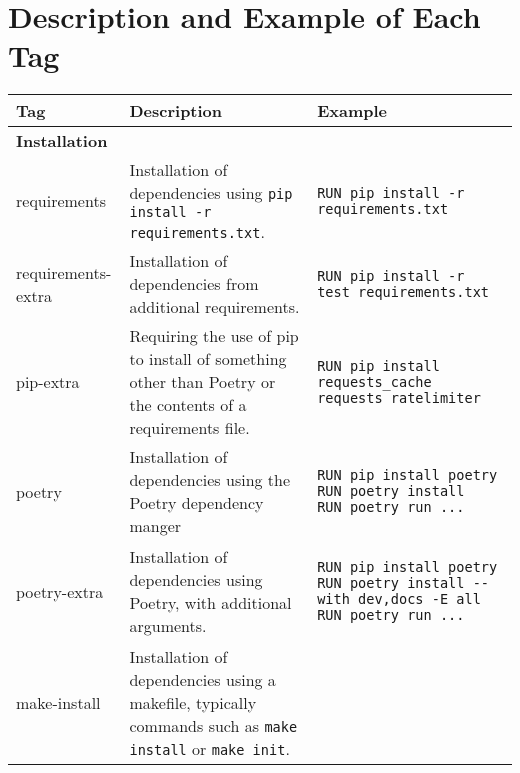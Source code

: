 \documentclass[conference]{IEEEtran}
\begin{document}
\section{Description and Example of Each Tag}
\begin{table}[!h]
\centering
\begin{tabular}{|lp{}l|}
\hline
\multicolumn{1}{|l|}{\textbf{Tag}}       & \multicolumn{1}{p{0.4\textwidth}|}{\textbf{Description}} 
& Example \\ \hline
\textbf{Installation}                    &  &  \\ \hline
\multicolumn{1}{|l|}{requirements}       & \multicolumn{1}{p{0.4\textwidth}|}{Installation of dependencies using \texttt{pip install -r requirements.txt}.} 
    & \begin{lstlisting}
RUN pip install -r requirements.txt
    \end{lstlisting}   \\ \hline
\multicolumn{1}{|l|}{requirements-extra} & \multicolumn{1}{p{0.4\textwidth}|}{Installation of dependencies from additional requirements.} 
    & \begin{lstlisting}
RUN pip install -r test_requirements.txt
    \end{lstlisting} \\ \hline
\multicolumn{1}{|l|}{pip-extra}          & \multicolumn{1}{p{0.4\textwidth}|}{Requiring the use of pip to install of something other than Poetry or the contents of a requirements file.}
    & \begin{lstlisting}
RUN pip install requests_cache requests_ratelimiter
    \end{lstlisting} \\ \hline
\multicolumn{1}{|l|}{poetry}             & \multicolumn{1}{p{0.4\textwidth}|}{Installation of dependencies using the Poetry dependency manger} 
    & \begin{lstlisting}
RUN pip install poetry
RUN poetry install
RUN poetry run ...
    \end{lstlisting} \\ \hline
\multicolumn{1}{|l|}{poetry-extra}       & \multicolumn{1}{p{0.4\textwidth}|}{Installation of dependencies using Poetry, with additional arguments.} 
    & \begin{lstlisting}
RUN pip install poetry
RUN poetry install --with dev,docs -E all
RUN poetry run ...        
    \end{lstlisting} \\ \hline
\multicolumn{1}{|l|}{make-install}       & \multicolumn{1}{p{0.4\textwidth}|}{Installation of dependencies using a makefile, typically commands such as \texttt{make install} or \texttt{make init}.} 

\end{tabular}
\end{table}
\end{document}
